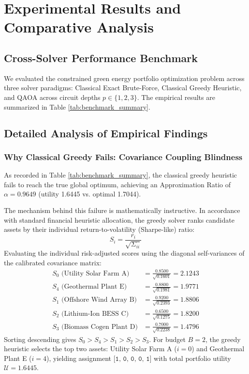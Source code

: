 \chapter{Experimental Results and Comparative Analysis}
\label{chap:results-and-discussion}

\section{Cross-Solver Performance Benchmark}
We evaluated the constrained green energy portfolio optimization problem across three solver paradigms: Classical Exact Brute-Force, Classical Greedy Heuristic, and QAOA across circuit depths $p \in \{1, 2, 3\}$. The empirical results are summarized in Table \ref{tab:benchmark_summary}.



\section{Detailed Analysis of Empirical Findings}

\subsection{Why Classical Greedy Fails: Covariance Coupling Blindness}
As recorded in Table \ref{tab:benchmark_summary}, the classical greedy heuristic fails to reach the true global optimum, achieving an Approximation Ratio of $\alpha = 0.9649$ (utility 1.6445 vs. optimal 1.7044).

The mechanism behind this failure is mathematically instructive. In accordance with standard financial heuristic allocation, the greedy solver ranks candidate assets by their individual return-to-volatility (Sharpe-like) ratio:
\begin{equation}
S_i = \frac{r_i}{\sqrt{\Sigma_{ii}}}
\end{equation}
Evaluating the individual risk-adjusted scores using the diagonal self-variances of the calibrated covariance matrix:
\begin{align*}
S_0 \text{ (Utility Solar Farm A)} &= \frac{0.8500}{\sqrt{0.1601}} = 2.1243 \\
S_4 \text{ (Geothermal Plant E)} &= \frac{0.8800}{\sqrt{0.1981}} = 1.9771 \\
S_1 \text{ (Offshore Wind Array B)} &= \frac{0.9200}{\sqrt{0.2393}} = 1.8806 \\
S_2 \text{ (Lithium-Ion BESS C)} &= \frac{0.6500}{\sqrt{0.1275}} = 1.8200 \\
S_3 \text{ (Biomass Cogen Plant D)} &= \frac{0.7000}{\sqrt{0.2238}} = 1.4796
\end{align*}
Sorting descending gives $S_0 > S_4 > S_1 > S_2 > S_3$. For budget $B=2$, the greedy heuristic selects the top two assets: Utility Solar Farm A ($i=0$) and Geothermal Plant E ($i=4$), yielding assignment $\texttt{[1, 0, 0, 0, 1]}$ with total portfolio utility $\mathcal{U} = 1.6445$.

